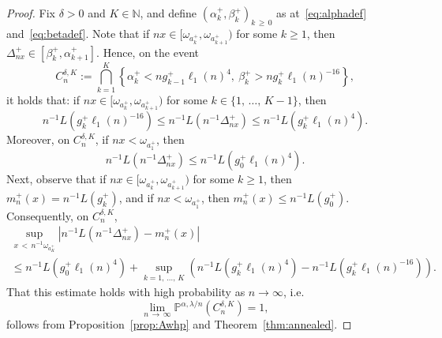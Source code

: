 \documentclass[AHL,Unicode,longabstracts,published]{cedram}
\newcommand{\N}{\mathbb N}
\renewcommand{\P}{\mathbb P}
\newcommand{\A}{{4}}
\newcommand{\B}{{16}}
\begin{document}
\begin{proof}
Fix $\delta>0$ and $K\in\N$, and define $(\alpha_k^+,\beta_k^+)_{k\,\geq\,0}$ as at~\eqref{eq:alphadef} and~\eqref{eq:betadef}.
Note that if $nx\in [\omega_{a_k^+},\omega_{a_{k+1}^+})$ for some $k\geq 1$, then $\Delta_{nx}^+\in[\beta_k^+,\alpha_{k+1}^+]$. Hence, on the event
\[
C_n^{\delta,K}:={\textstyle\bigcap_{k=1}^K}\left\{\alpha_k^+<ng_{k-1}^+\ell_1(n)^\A,\:\beta_k^+>ng_{k}^+\ell_1(n)^{-\B}\right\},
\]
it holds that: if $nx\in [\omega_{a_k^+},\omega_{a_{k+1}^+})$ for some $k\in\{1,\,\dots,\,K-1\}$, then
\[
n^{-1}L\left(g_{k}^+\ell_1(n)^{-\B}\right)\leq n^{-1}L\left(n^{-1}\Delta_{nx}^+\right)\leq n^{-1}L\left(g_{k}^+\ell_1(n)^\A\right).
\]
Moreover, on $C_n^{\delta,K}$, if $nx< \omega_{a_1^+}$, then
\[
n^{-1}L\left(n^{-1}\Delta_{nx}^+\right)\leq n^{-1}L\left(g_{0}^+\ell_1(n)^\A\right).
\]
Next, observe that if $nx\in [\omega_{a_k^+},\omega_{a_{k+1}^+})$ for some $k\geq 1$, then $m_n^+(x)=n^{-1}L(g_k^+)$, and if $nx<\omega_{a_1^+}$, then $m_n^+(x)\leq n^{-1}L(g_0^+)$. Consequently, on $C_n^{\delta,K}$,
\begin{multline*}
\sup_{x\,<\,n^{-1} \omega_{a_K^+}}\left| n^{-1}L\left(n^{-1}\Delta_{nx}^+\right)-m_n^+(x)\right|\\
\leq n^{-1}L\left(g_{0}^+\ell_1(n)^\A\right)+\sup_{k=1,\,\dots,\,K}
\left(n^{-1}L\left(g_{k}^+\ell_1(n)^\A\right)- n^{-1}L\left(g_{k}^+\ell_1(n)^{-\B}\right)\right).
\end{multline*}
That this estimate holds with high probability as $n\rightarrow\infty$, i.e.\
\[
\lim_{n\,\rightarrow\,\infty}\P^{\alpha,\lambda/n}\left(C_n^{\delta,K}\right)=1,
\]
follows from Proposition~\ref{prop:Awhp} and Theorem~\ref{thm:annealed}.


\end{proof}
\end{document}
